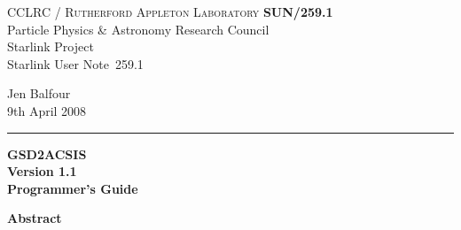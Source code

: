 \documentclass[twoside,11pt]{article}
\newcommand{\stardoccategory}  {Starlink User Note}
\newcommand{\stardocinitials}  {SUN}
\newcommand{\stardocnumber}    {259.1}
\newcommand{\stardocauthors}   {Jen Balfour}
\newcommand{\stardocdate}      {9th April 2008}
\newcommand{\stardoctitle}     {GSD2ACSIS}
\newcommand{\stardocversion}   {Version 1.1}
\newcommand{\stardocmanual}    {Programmer's Guide}
\newcommand{\stardocname}{\stardocinitials /\stardocnumber}
\newenvironment{latexonly}{}{}
\renewcommand{\_}{\texttt{\symbol{95}}}
\begin{document}
\thispagestyle{empty}

\begin{latexonly}
   CCLRC / \textsc{Rutherford Appleton Laboratory} \hfill \textbf{\stardocname}\\
   {\large Particle Physics \& Astronomy Research Council}\\
   {\large Starlink Project\\}
   {\large \stardoccategory\ \stardocnumber}
   \begin{flushright}
   \stardocauthors\\
   \stardocdate
   \end{flushright}
   \vspace{-4mm}
   \rule{\textwidth}{0.5mm}
   \vspace{5mm}
   \begin{center}
   {\Huge\textbf{\stardoctitle \\ [2.5ex]}}
   {\LARGE\textbf{\stardocversion \\ [4ex]}}
   {\Huge\textbf{\stardocmanual}}
   \end{center}
   \vspace{5mm}


   \vspace{10mm}
   \begin{center}
      {\Large\textbf{Abstract}}
   \end{center}
\end{latexonly}
\end{document}
